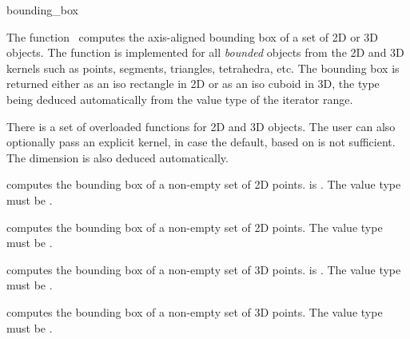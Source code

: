 
\begin{ccRefFunction}{bounding_box}  

\ccDefinition
  
The function \ccRefName\ computes the axis-aligned bounding box of a set of 2D or 3D objects. The function is implemented for all \emph{bounded} objects from the 2D and 3D kernels such as points, segments, triangles, tetrahedra, etc. The bounding box is returned either as an iso rectangle in 2D or as an iso cuboid in 3D, the type being deduced automatically from the value type of the iterator range.


There is a set of overloaded  functions for 2D and 3D objects.
The user can also optionally pass an explicit kernel, in case the default,
based on  is not sufficient.
The dimension is also deduced automatically.

{ computes the bounding box of a non-empty set of 2D points.
   is .  The value type must be .
 }

{ computes the bounding box of a non-empty set of 2D points.
  The value type must be .
 }

{ computes the bounding box of a non-empty set of 3D points.
   is .
  The value type must be .
 }

{ computes the bounding box of a non-empty set of 3D points.
  The value type must be .
 }

\end{ccRefFunction}
